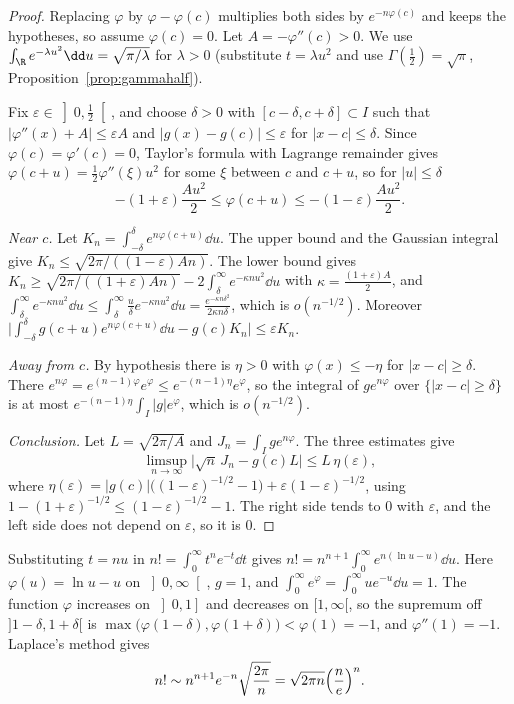 \begin{proof}
Replacing $\varphi$ by $\varphi-\varphi(c)$ multiplies both sides by $e^{-n\varphi(c)}$ and keeps the hypotheses, so assume $\varphi(c)=0$. Let $A=-\varphi''(c)>0$.
We use $\int_\R e^{-\lambda u^2}\dd u=\sqrt{\pi/\lambda}$ for $\lambda>0$ (substitute $t=\lambda u^2$ and use $\Gamma(\frac12)=\sqrt\pi$, Proposition~\ref{prop:gammahalf}).

Fix $\varepsilon\in\left]0,\frac12\right[$, and choose $\delta>0$ with $[c-\delta,c+\delta]\subset I$ such that $|\varphi''(x)+A|\le\varepsilon A$ and $|g(x)-g(c)|\le\varepsilon$ for
$|x-c|\le\delta$. Since $\varphi(c)=\varphi'(c)=0$, Taylor's formula with Lagrange remainder gives $\varphi(c+u)=\frac12\varphi''(\xi)u^2$ for some $\xi$ between $c$ and $c+u$, so for $|u|\le\delta$
\[
-(1+\varepsilon)\frac{Au^2}2\le\varphi(c+u)\le-(1-\varepsilon)\frac{Au^2}2.
\]

\emph{Near $c$.} Let $K_n=\int_{-\delta}^\delta e^{n\varphi(c+u)}\dd u$. The upper bound and the Gaussian integral give $K_n\le\sqrt{2\pi/((1-\varepsilon)An)}$.
The lower bound gives $K_n\ge\sqrt{2\pi/((1+\varepsilon)An)}-2\int_\delta^\infty e^{-\kappa nu^2}\dd u$ with $\kappa=\frac{(1+\varepsilon)A}2$, and
$\int_\delta^\infty e^{-\kappa nu^2}\dd u\le\int_\delta^\infty\frac u\delta e^{-\kappa nu^2}\dd u=\frac{e^{-\kappa n\delta^2}}{2\kappa n\delta}$, which is $o(n^{-1/2})$.
Moreover $\bigl|\int_{-\delta}^\delta g(c+u)e^{n\varphi(c+u)}\dd u-g(c)K_n\bigr|\le\varepsilon K_n$.

\emph{Away from $c$.} By hypothesis there is $\eta>0$ with $\varphi(x)\le-\eta$ for $|x-c|\ge\delta$. There $e^{n\varphi}=e^{(n-1)\varphi}e^\varphi\le e^{-(n-1)\eta}e^\varphi$, so
the integral of $ge^{n\varphi}$ over $\{|x-c|\ge\delta\}$ is at most $e^{-(n-1)\eta}\int_I|g|e^\varphi$, which is $o(n^{-1/2})$.

\emph{Conclusion.} Let $L=\sqrt{2\pi/A}$ and $J_n=\int_Ige^{n\varphi}$. The three estimates give
\[
\limsup_{n\to\infty}\bigl|\sqrt n\,J_n-g(c)L\bigr|\le L\,\eta(\varepsilon),
\]
where $\eta(\varepsilon)=|g(c)|\bigl((1-\varepsilon)^{-1/2}-1\bigr)+\varepsilon(1-\varepsilon)^{-1/2}$,
using $1-(1+\varepsilon)^{-1/2}\le(1-\varepsilon)^{-1/2}-1$. The right side tends to $0$ with $\varepsilon$, and the left side does not depend on $\varepsilon$, so it is $0$.
\end{proof}

\begin{example}\label{ex:stirlinglaplace}
Substituting $t=nu$ in $n!=\int_0^\infty t^ne^{-t}\dd t$ gives $n!=n^{n+1}\int_0^\infty e^{n(\ln u-u)}\dd u$. Here $\varphi(u)=\ln u-u$ on $\left]0,\infty\right[$, $g=1$, and
$\int_0^\infty e^\varphi=\int_0^\infty ue^{-u}\dd u=1$. The function $\varphi$ increases on $\left]0,1\right]$ and decreases on $[1,\infty[$, so the supremum off
$]1-\delta,1+\delta[$ is $\max\bigl(\varphi(1-\delta),\varphi(1+\delta)\bigr)<\varphi(1)=-1$, and $\varphi''(1)=-1$. Laplace's method gives
\[
n!\sim n^{n+1}e^{-n}\sqrt{\frac{2\pi}n}=\sqrt{2\pi n}\Bigl(\frac ne\Bigr)^n.
\]
\end{example}

